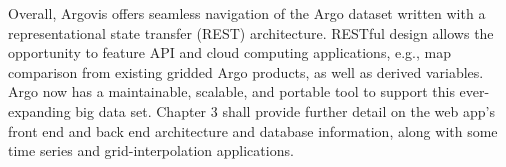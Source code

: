 Overall, Argovis offers seamless navigation of the Argo dataset written with a representational state transfer (REST) architecture. RESTful design allows the opportunity to feature API and cloud computing applications, e.g., map comparison from existing gridded Argo products, as well as derived variables. Argo now has a maintainable, scalable, and portable tool to support this ever-expanding big data set. Chapter 3 shall provide further detail on the web app's front end and back end architecture and database information, along with some time series and grid-interpolation applications.